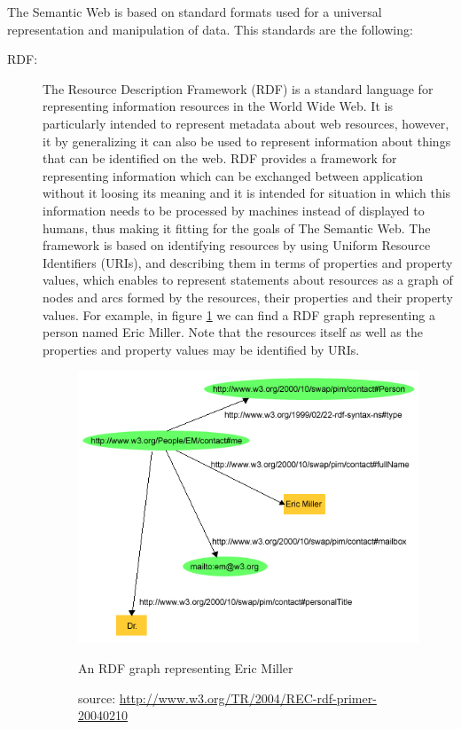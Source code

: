 The Semantic Web is based on standard formats used for a universal representation and manipulation of data. This standards are the following:

\begin{description}
	\item[RDF:] The Resource Description Framework (RDF) is a standard language for representing information resources in the World Wide Web. It is particularly intended to represent metadata about web resources, however, it by generalizing it can also be used to represent information about things that can be identified on the web. \cite{w3crdf}
	RDF provides a framework for representing information which can be exchanged between application without it loosing its meaning and it is intended for situation in which this information needs to be processed by machines instead of displayed to humans, thus making it fitting for the goals of The Semantic Web.
	The framework is based on identifying resources by using Uniform Resource Identifiers (URIs), and describing them in terms of properties and property values, which enables to represent statements about resources as a graph of nodes and arcs formed by the resources, their properties and their property values. For example, in figure \ref{fig:rdfexample} we can find a RDF graph representing a person named Eric Miller. Note that the resources itself as well as the properties and property values may be identified by URIs.
	\begin{figure}
	  \centering
	  \includegraphics[width=.5\textwidth]{fig/rdfexample}
	  \caption{An RDF graph representing Eric Miller}
	  \caption*{source: \url{http://www.w3.org/TR/2004/REC-rdf-primer-20040210}}
	  \label{fig:rdfexample}
	\end{figure}

\end{description}









